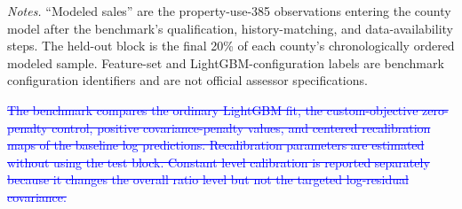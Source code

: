 \documentclass[10pt]{article}
\theoremstyle{definition}
\newcommand{\1}{\mathbf{1}}
\newcommand{\oldtext}[1]{\textcolor{blue}{\sout{#1}}}
\begin{document}
{\color{impGreen}
\begin{table}[!htbp]
\centering
\scriptsize
\setlength{\tabcolsep}{3.6pt}
\renewcommand{\arraystretch}{1.05}
\caption{County-specific sample and modeling configuration for the exploratory ATTOM benchmark.}
\label{tab:attom_design_appendix}
\vspace{1mm}
\begin{minipage}{0.98\textwidth}
\scriptsize
\emph{Notes.} ``Modeled sales'' are the property-use-385 observations entering the county model after the benchmark's qualification, history-matching, and data-availability steps. The held-out block is the final 20\% of each county's chronologically ordered modeled sample. Feature-set and LightGBM-configuration labels are benchmark configuration identifiers and are not official assessor specifications.
\end{minipage}
\end{table}
}

\oldtext{The benchmark compares the ordinary LightGBM fit, the custom-objective zero-penalty control, positive covariance-penalty values, and centered recalibration maps of the baseline log predictions. Recalibration parameters are estimated without using the test block. Constant level calibration is reported separately because it changes the overall ratio level but not the targeted log-residual covariance.}
\end{document}
